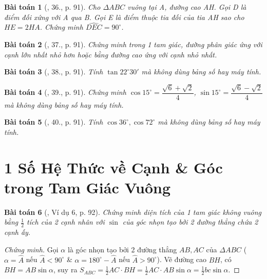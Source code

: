 \documentclass{article}
\newtheorem{baitoan}{Bài toán}
\begin{document}
\begin{baitoan}[\cite{Binh_Toan_9_tap_1}, 36., p. 91]
	Cho $\Delta ABC$ vuông tại A, đường cao AH. Gọi D là điểm đối xứng với A qua B. Gọi E là điểm thuộc tia đối của tia AH sao cho $HE = 2HA$. Chứng minh $\widehat{DEC} = 90^\circ$.
\end{baitoan}

\begin{baitoan}[\cite{Binh_Toan_9_tap_1}, 37., p. 91]
	Chứng minh trong 1 tam giác, đường phân giác ứng với cạnh lớn nhất nhỏ hơn hoặc bằng đường cao ứng với cạnh nhỏ nhất.
\end{baitoan}

\begin{baitoan}[\cite{Binh_Toan_9_tap_1}, 38., p. 91]
	Tính $\tan22^\circ30'$ mà không dùng bảng số hay máy tính.
\end{baitoan}

\begin{baitoan}[\cite{Binh_Toan_9_tap_1}, 39., p. 91]
	Chứng minh $\cos15^\circ = \dfrac{\sqrt{6} + \sqrt{2}}{4}$, $\sin15^\circ = \dfrac{\sqrt{6} - \sqrt{2}}{4}$ mà không dùng bảng số hay máy tính.
\end{baitoan}

\begin{baitoan}[\cite{Binh_Toan_9_tap_1}, 40., p. 91]
	Tính $\cos36^\circ,\cos72^\circ$ mà không dùng bảng số hay máy tính.
\end{baitoan}


\section{1 Số Hệ Thức về Cạnh \& Góc trong Tam Giác Vuông}

\begin{baitoan}[\cite{Binh_Toan_9_tap_1}, Ví dụ 6, p. 92]
	Chứng minh diện tích của 1 tam giác không vuông bằng $\frac{1}{2}$ tích của 2 cạnh nhân với $\sin$ của góc nhọn tạo bởi 2 đường thẳng chứa 2 cạnh ấy.
\end{baitoan}

\begin{proof}[Chứng minh]
	Gọi $\alpha$ là góc nhọn tạo bởi 2 đường thẳng $AB,AC$ của $\Delta ABC$ ($\alpha = \widehat{A}$ nếu $\widehat{A} < 90^\circ$ \& $\alpha = 180^\circ - \widehat{A}$ nếu $\widehat{A} > 90^\circ$). Vẽ đường cao $BH$, có $BH = AB\sin\alpha$, suy ra $S_{ABC} = \frac{1}{2}AC\cdot BH = \frac{1}{2}AC\cdot AB\sin\alpha = \frac{1}{2}bc\sin\alpha$.
\end{proof}
\end{document}
